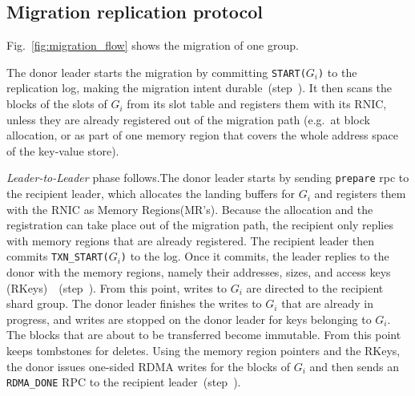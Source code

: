 \subsection{Migration replication protocol}
\label{sec:migration-phases}
\label{sec:intra-donor}
\label{sec:leader-to-leader}
\label{sec:intra-recipient}
\label{sec:commit-completion}

Fig.~\ref{fig:migration_flow} shows the migration of one group.

The donor leader starts the migration by committing \texttt{START($G_i$)} to the replication log, making the migration intent durable~(step~).
It then scans the blocks of the slots of $G_i$ from its slot table and registers them with its RNIC, unless they are already registered out of the migration path (e.g.\ at block allocation, or as part of one memory region that covers the whole address space of the key-value store).

\emph{Leader-to-Leader} phase follows.The donor leader starts by sending \texttt{prepare} rpc to the recipient leader, which allocates the landing buffers for $G_i$ and registers them with the RNIC as Memory Regions(MR's).
Because the allocation and the registration can take place out of the migration path, the recipient only replies with memory regions that are already registered.
The recipient leader then commits \texttt{TXN\_START($G_i$)} to the log.
Once it commits, the leader replies to the donor with the memory regions, namely their addresses, sizes, and access keys (RKeys)~\cite{Infiniband-spec}~(step~).
From this point, writes to $G_i$ are directed to the recipient shard group.
The donor leader finishes the writes to $G_i$ that are already in progress, and writes are stopped on the donor leader for keys belonging to $G_i$.
The blocks that are about to be transferred become immutable.
From this point \OurImplementation{} keeps tombstones for deletes.
Using the memory region pointers and the RKeys, the donor issues one-sided RDMA writes for the blocks of $G_i$ and then sends an \texttt{RDMA\_DONE} RPC to the recipient leader~(step~).

